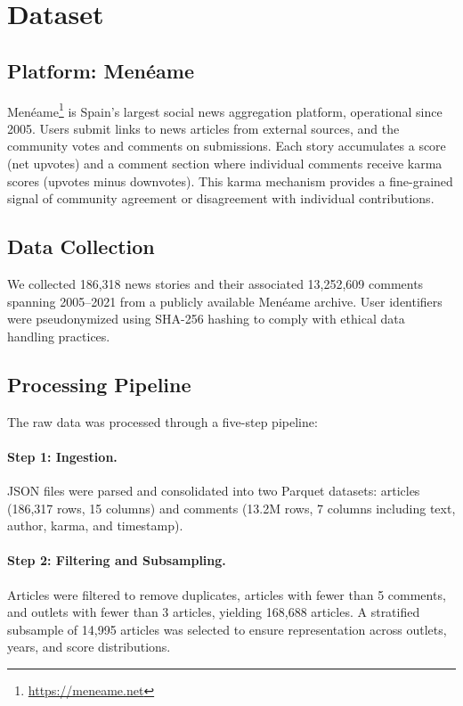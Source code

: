\section{Dataset}
\label{sec:dataset}

\subsection{Platform: Men\'eame}

Men\'eame\footnote{\url{https://meneame.net}} is Spain's largest social news aggregation platform, operational since 2005.
Users submit links to news articles from external sources, and the community votes and comments on submissions.
Each story accumulates a score (net upvotes) and a comment section where individual comments receive karma scores (upvotes minus downvotes).
This karma mechanism provides a fine-grained signal of community agreement or disagreement with individual contributions.

\subsection{Data Collection}

We collected 186,318 news stories and their associated 13,252,609 comments spanning 2005--2021 from a publicly available Men\'eame archive.
User identifiers were pseudonymized using SHA-256 hashing to comply with ethical data handling practices.

\subsection{Processing Pipeline}

The raw data was processed through a five-step pipeline:

\paragraph{Step 1: Ingestion.}
JSON files were parsed and consolidated into two Parquet datasets: articles (186,317 rows, 15 columns) and comments (13.2M rows, 7 columns including text, author, karma, and timestamp).

\paragraph{Step 2: Filtering and Subsampling.}
Articles were filtered to remove duplicates, articles with fewer than 5 comments, and outlets with fewer than 3 articles, yielding 168,688 articles.
A stratified subsample of 14,995 articles was selected to ensure representation across outlets, years, and score distributions.

